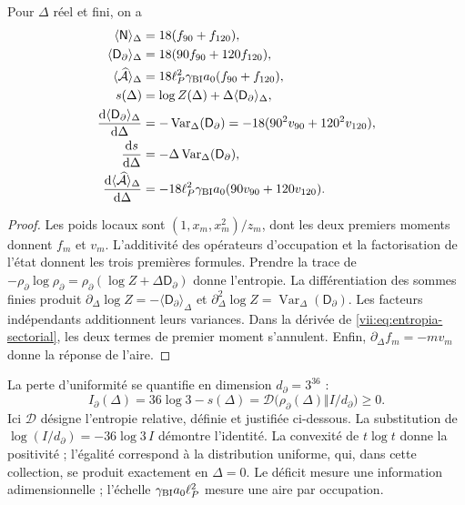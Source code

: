 \begin{proposition}
\label{vii:prop:respuesta-sectorial}
Pour \(\Delta\) réel et fini, on a
\begin{align}
 \langle\mathsf N\rangle_\Delta&=18(f_{90}+f_{120}),\\
 \langle\mathsf D_\partial\rangle_\Delta&=18(90f_{90}+120f_{120}),\\
 \langle\widehat{\mathcal A}\rangle_\Delta
 &=18\ell_P^2\gamma_{\rm BI}a_0(f_{90}+f_{120}),\\
 s(\Delta)&=\log Z(\Delta)+\Delta\langle\mathsf D_\partial\rangle_\Delta,
 \label{vii:eq:entropia-sectorial}\\
 \frac{\mathrm d\langle\mathsf D_\partial\rangle_\Delta}{\mathrm d\Delta}
 &=-\operatorname{Var}_\Delta(\mathsf D_\partial)
  =-18(90^2v_{90}+120^2v_{120}),\\
 \frac{\mathrm ds}{\mathrm d\Delta}
 &=-\Delta\operatorname{Var}_\Delta(\mathsf D_\partial),\\
 \frac{\mathrm d\langle\widehat{\mathcal A}\rangle_\Delta}{\mathrm d\Delta}
 &=-18\ell_P^2\gamma_{\rm BI}a_0(90v_{90}+120v_{120}).
 \label{vii:eq:respuestas-area-entropia}
\end{align}
\end{proposition}
\begin{proof}
Les poids locaux sont \((1,x_m,x_m^2)/z_m\), dont les deux premiers moments donnent \(f_m\) et \(v_m\). L'additivité des opérateurs d'occupation et la factorisation de l'état donnent les trois premières formules. Prendre la trace de \(-\rho_\partial\log\rho_\partial
=\rho_\partial(\log Z+\Delta\mathsf D_\partial)\) donne l'entropie. La différentiation des sommes finies produit \(\partial_\Delta\log Z=-\langle\mathsf D_\partial\rangle_\Delta\) et \(\partial_\Delta^2\log Z
=\operatorname{Var}_\Delta(\mathsf D_\partial)\). Les facteurs indépendants additionnent leurs variances. Dans la dérivée de \eqref{vii:eq:entropia-sectorial}, les deux termes de premier moment s'annulent. Enfin, \(\partial_\Delta f_m=-mv_m\) donne la réponse de l'aire.
\end{proof}

La perte d'uniformité se quantifie en dimension \(d_\partial=3^{36}\) :
\begin{equation}
 I_\partial(\Delta)
 =36\log3-s(\Delta)
 =\mathcal D\bigl(\rho_\partial(\Delta)\Vert I/d_\partial\bigr)\ge0.
 \label{vii:eq:deficit-informacional}
\end{equation}
Ici \(\mathcal D\) désigne l'entropie relative, définie et justifiée ci-dessous. La substitution de \(\log(I/d_\partial)=-36\log3\,I\) démontre l'identité. La convexité de \(t\log t\) donne la positivité ; l'égalité correspond à la distribution uniforme, qui, dans cette collection, se produit exactement en \(\Delta=0\). Le déficit mesure une information adimensionnelle ; l'échelle \(\gamma_{\rm BI}a_0\ell_P^2\) mesure une aire par occupation.

